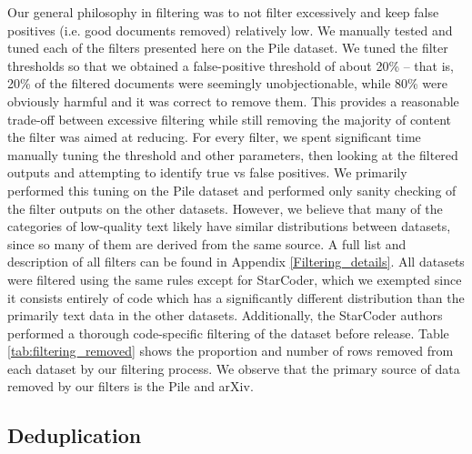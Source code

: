 \documentclass{article}
\begin{document}
Our general philosophy in filtering was to not filter excessively and keep false positives (i.e. good documents removed) relatively low. We manually tested and tuned each of the filters presented here on the Pile dataset. We tuned the filter thresholds so that we obtained a false-positive threshold of about 20\% – that is, 20\% of the filtered documents were seemingly unobjectionable, while 80\% were obviously harmful and it was correct to remove them. This provides a reasonable trade-off between excessive filtering while still removing the majority of content the filter was aimed at reducing. For every filter, we spent significant time manually tuning the threshold and other parameters, then looking at the filtered outputs and attempting to identify true vs false positives. We primarily performed this tuning on the Pile dataset and performed only sanity checking of the filter outputs on the other datasets. However, we believe that many of the categories of low-quality text likely have similar distributions between datasets, since so many of them are derived from the same source. A full list and description of all filters can be found in Appendix \ref{Filtering_details}. 
All datasets were filtered using the same rules except for StarCoder, which we exempted since it consists entirely of code which has a significantly different distribution than the primarily text data in the other datasets. Additionally, the StarCoder authors performed a thorough code-specific filtering of the dataset before release. Table \ref{tab:filtering_removed} shows the proportion and number of rows removed from each dataset by our filtering process. We observe that the primary source of data removed by our filters is the Pile and arXiv. 




\subsection{Deduplication}
\end{document}
